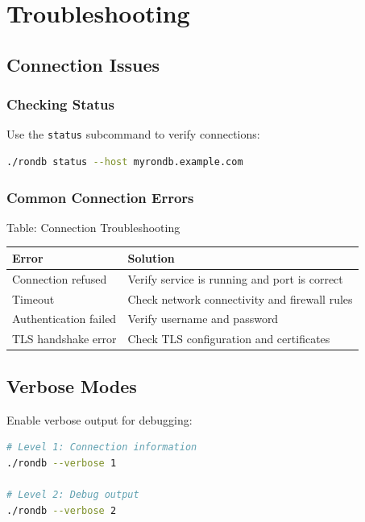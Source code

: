\documentclass[11pt,a4paper]{report}
\begin{document}
\chapter{Troubleshooting}

\section{Connection Issues}

\subsection{Checking Status}

Use the \texttt{status} subcommand to verify connections:

\begin{lstlisting}[language=bash]
./rondb status --host myrondb.example.com
\end{lstlisting}

\subsection{Common Connection Errors}

Table: Connection Troubleshooting

\begin{tabular}{ll}
\toprule
Error & Solution \\
\midrule
Connection refused & Verify service is running and port is correct \\
Timeout & Check network connectivity and firewall rules \\
Authentication failed & Verify username and password \\
TLS handshake error & Check TLS configuration and certificates \\
\bottomrule
\end{tabular}

\section{Verbose Modes}

Enable verbose output for debugging:

\begin{lstlisting}[language=bash]
# Level 1: Connection information
./rondb --verbose 1

# Level 2: Debug output
./rondb --verbose 2
\end{lstlisting}
\end{document}
